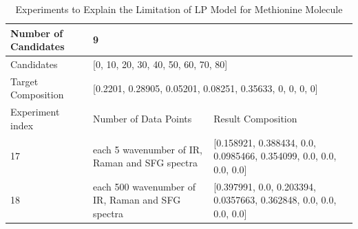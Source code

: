\begin{table}\tiny \label{tab:4.4}
\begin{center}
\begin{tabular}{| l | l | l | l }
\hline
Number of Candidates & \multicolumn{2}{l|}{9} \\ \hline
Candidates & \multicolumn{2}{l|}{[0, 10, 20, 30, 40, 50, 60, 70, 80]} \\ \hline
Target Composition & \multicolumn{2}{l|}{[0.2201, 0.28905, 0.05201, 0.08251, 0.35633, 0, 0, 0, 0]} \\ \hline
Experiment index & Number of Data Points & Result Composition \\ \hline
17 & each 5 wavenumber of IR, Raman and SFG spectra & [0.158921, 0.388434, 0.0, 0.0985466, 0.354099, 0.0, 0.0, 0.0, 0.0] \\ \hline
18 & each 500 wavenumber of IR, Raman and SFG spectra & [0.397991, 0.0, 0.203394, 0.0357663, 0.362848, 0.0, 0.0, 0.0, 0.0] \\ \hline
\end{tabular} 
\end{center}
\caption{Experiments to Explain the Limitation of LP Model for Methionine Molecule}
\end{table}	





 
